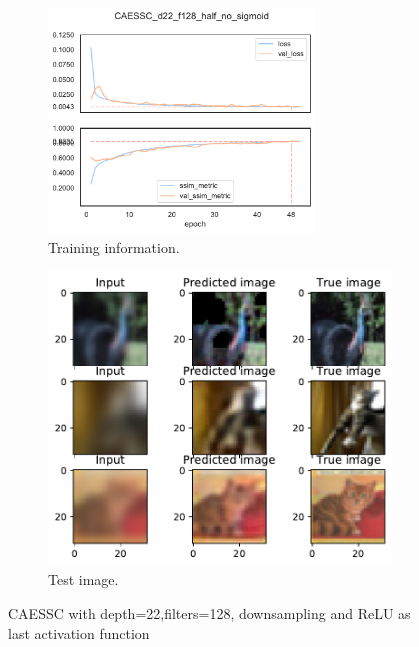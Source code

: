 \begin{figure}[H]
    \centering
    \begin{subfigure}{0.45\textwidth}
        \includegraphics[width=200pt,keepaspectratio]{subsections/caessc/plot_history_CAESSC_d22_f128_half_no_sigmoid.pdf}
        \caption{Training information.}        
    \end{subfigure}
    \begin{subfigure}{0.45\textwidth}
        \includegraphics[height=0.4\textheight,keepaspectratio]{subsections/caessc/test_CAESSC_d22_f128_half_no_sigmoid.pdf}
        \caption{Test image.}
    \end{subfigure}
    \caption{CAESSC with depth=22,filters=128, downsampling and ReLU as last activation function}
\end{figure}


